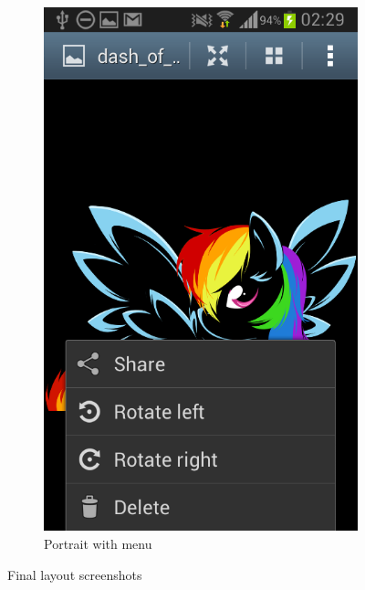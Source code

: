 \documentclass[a4paper,11pt]{article}
\begin{document}
\begin{figure}[p]
\begin{subfigure}{0.5\textwidth}
		\includegraphics[scale=0.3]{scr2}
		\caption{Portrait with menu}
		\label{flpm}
	\end{subfigure}
	\caption{Final layout screenshots}
	\label{fl}
\end{figure}


\end{document}
